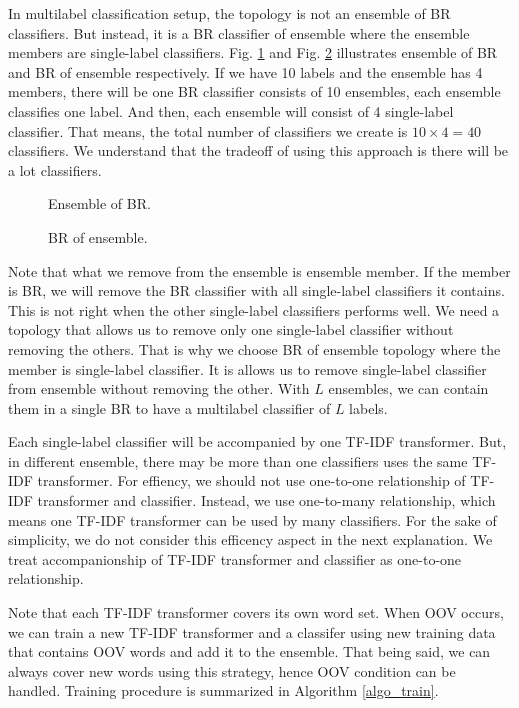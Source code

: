 \documentclass[conference]{IEEEtran}
\begin{document}
In multilabel classification setup, the topology is not an ensemble of BR classifiers.
But instead, it is a BR classifier of ensemble where the ensemble members are single-label classifiers.
Fig. \ref{ensemble_of_br} and Fig. \ref{br_of_ensemble} illustrates ensemble of BR and BR of ensemble respectively.
If we have 10 labels and the ensemble has 4 members, there will be one BR classifier consists of 10 ensembles, each ensemble classifies one label.
And then, each ensemble will consist of 4 single-label classifier.
That means, the total number of classifiers we create is $10 \times 4 = 40$ classifiers.
We understand that the tradeoff of using this approach is there will be a lot classifiers.

\begin{figure}[!htb]
\centering
\caption{Ensemble of BR.}
\label{ensemble_of_br}
\end{figure}

\begin{figure}[!htb]
\centering
\caption{BR of ensemble.}
\label{br_of_ensemble}
\end{figure}

Note that what we remove from the ensemble is ensemble member.
If the member is BR, we will remove the BR classifier with all single-label classifiers it contains.
This is not right when the other single-label classifiers performs well.
We need a topology that allows us to remove only one single-label classifier without removing the others.
That is why we choose BR of ensemble topology where the member is single-label classifier.
It is allows us to remove single-label classifier from ensemble without removing the other.
With $L$ ensembles, we can contain them in a single BR to have a multilabel classifier of $L$ labels.

Each single-label classifier will be accompanied by one TF-IDF transformer.
But, in different ensemble, there may be more than one classifiers uses the same TF-IDF transformer.
For effiency, we should not use one-to-one relationship of TF-IDF transformer and classifier.
Instead, we use one-to-many relationship, which means one TF-IDF transformer can be used by many classifiers.
For the sake of simplicity, we do not consider this efficency aspect in the next explanation.
We treat accompanionship of TF-IDF transformer and classifier as one-to-one relationship.

Note that each TF-IDF transformer covers its own word set.
When OOV occurs, we can train a new TF-IDF transformer and a classifer using new training data that contains OOV words and add it to the ensemble.
That being said, we can always cover new words using this strategy, hence OOV condition can be handled.
Training procedure is summarized in Algorithm \ref{algo_train}.
\end{document}
